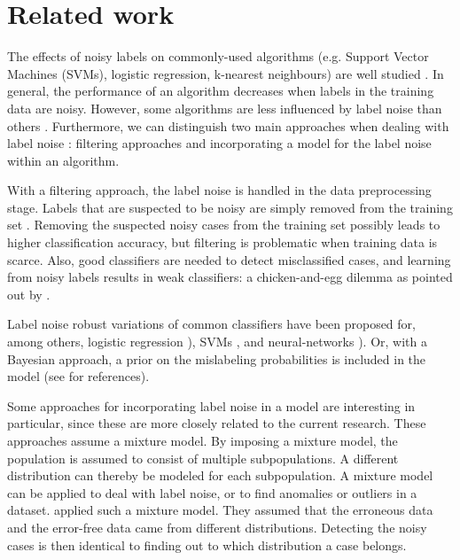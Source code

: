 \documentclass[12pt, a4paper, titlepage]{article}
\begin{document}
							\section{Related work}
							\label{section:related}

The effects of noisy labels on commonly-used algorithms (e.g. Support Vector Machines (SVMs), logistic regression, k-nearest neighbours) are well studied \citep{Pech, Nettleton}. In general, the performance of an algorithm decreases when labels in the training data are noisy. However, some algorithms are less influenced by label noise than others \citep{Frenay}. Furthermore, we can distinguish two main approaches when dealing with label noise \citep{Frenay}: filtering approaches and  incorporating a model for the label noise within an algorithm. 

With a filtering approach, the label noise is handled in the data preprocessing stage. Labels that are suspected to be noisy are simply removed from the training set \citep{Brodley}. Removing the suspected noisy cases from the training set possibly leads to higher classification accuracy, but filtering is problematic when training data is scarce. Also, good classifiers are needed to detect misclassified cases, and learning from noisy labels results in weak classifiers: a chicken-and-egg dilemma as pointed out by \citet{Angelova}.

Label noise robust variations of common classifiers have been proposed for, among others, logistic regression \citep{Bootkrajang, Rantalainen}), SVMs \citep{Stempfel}, and neural-networks \citep{Sigurdsson, Sukhbaatar}). Or, with a Bayesian approach, a prior on the mislabeling probabilities is included in the model (see \citet{Frenay} for references).

Some approaches for incorporating label noise in a model are interesting in particular, since these are more closely related to the current research. These approaches assume a mixture model. By imposing a mixture model, the population is assumed to consist of multiple subpopulations. A different distribution can thereby be modeled for each subpopulation. A mixture model can be applied to deal with label noise, or to find anomalies or outliers in a dataset. \citet{DiZio, Eskin} applied such a mixture model. They assumed that the erroneous data and the error-free data came from different distributions. Detecting the noisy cases is then identical to finding out to which distribution a case belongs.
\end{document}

